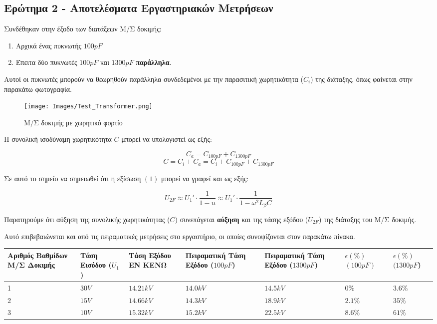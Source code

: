 \documentclass[titlepage, 12pt, a4paper]{article}
\begin{document}
\subsection*{Ερώτημα 2 - Αποτελέσματα Εργαστηριακών Μετρήσεων}

\vspace{0.2cm}
Συνδέθηκαν στην έξοδο των διατάξεων Μ/Σ δοκιμής:
\begin{enumerate}
    \item Αρχικά ένας πυκνωτής $100pF$
    \item Έπειτα δύο πυκνωτές $100pF$ και $1300pF$ \textbf{παράλληλα}.
\end{enumerate}
Αυτοί οι πυκνωτές μπορούν να θεωρηθούν παράλληλα συνδεδεμένοι με την παρασιτική χωρητικότητα ($C_i$) της διάταξης, όπως φαίνεται στην παρακάτω φωτογραφία.\\

\begin{figure}[h]
    \centering
    \texttt{[image: Images/Test\_Transformer.png]}
    \caption{Μ/Σ δοκιμής με χωρητικό φορτίο}
\end{figure}

Η συνολική ισοδύναμη χωρητικότητα $C$ μπορεί να υπολογιστεί ως εξής:

\[C_a = C_{100pF} +  C_{1300pF}\]
\[ C = C_i + C_a = C_i + C_{100pF} + C_{1300pF}\]

\vspace{0.2cm}
Σε αυτό το σημείο να σημειωθεί ότι η εξίσωση $(1)$ μπορεί να γραφεί και ως εξής:

\begin{equation}
U_{2F} \approx U_1'\cdot \frac{1}{1-u} \approx U_1'\cdot \frac{1}{1-\omega^2L_{\beta
}C}
\end{equation}

\vspace{0.2cm}
Παρατηρούμε ότι αύξηση της συνολικής χωρητικότητας ($C$) συνεπάγεται \textbf{αύξηση} και της τάσης εξόδου ($U_{2F}$) της διάταξης του Μ/Σ δοκιμής.

\vspace{0.2cm}
Αυτό επιβεβαιώνεται και από τις πειραματικές μετρήσεις στο εργαστήριο, οι οποίες συνοψίζονται στον παρακάτω πίνακα.

\vspace{0.5cm}
\centering
\begin{tabular}{|P{2.2cm}|P{1.5cm}|P{1.5cm}|P{2.1cm}|P{2.1cm}|P{1.5cm}|P{1.5cm}|} \hline 
         Αριθμός Βαθμίδων Μ/Σ Δοκιμής & Τάση Εισόδου ($U_1$) & Τάση Εξόδου ΕΝ ΚΕΝΩ & Πειραματική Τάση Εξόδου ($100pF$) & Πειραματική Τάση Εξόδου ($1300pF$) & $\epsilon(\%)$ $(100pF)$ & $\epsilon(\%)$ $(1300pF$)\\  & $30V$ & $14.21kV$ & $14.0kV$ & $14.5kV$ & $0\%$ & $3.6\%$\\  & $15V$ & $14.66kV$ & $14.3kV$ & $18.9kV$ & $2.1\%$ & $35\%$\\  & $10V$ & $15.32kV$ & $15.2kV$ & $22.5kV$ & $8.6\%$ & $61\%$\\ \hline
    \end{tabular}
\end{document}
